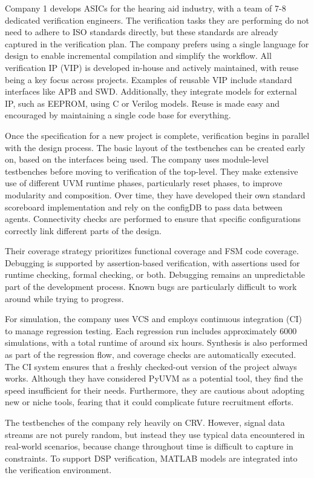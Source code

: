 \documentclass[12pt]{report}
\begin{document}
Company 1 develops ASICs for the hearing aid industry, with a team of 7-8 dedicated verification engineers. The
verification tasks they are performing do not need to adhere to ISO standards directly, but these standards are
already captured in the verification plan. The company prefers using a single language for design to enable
incremental compilation and simplify the workflow. All verification IP (VIP) is developed in-house and actively
maintained, with reuse being a key focus across projects. Examples of reusable VIP include standard interfaces like
APB and SWD. Additionally, they integrate models for external IP, such as EEPROM, using C or Verilog models. Reuse is
made easy and encouraged by maintaining a single code base for everything.

Once the specification for a new project is complete, verification begins in parallel with the design process. The
basic layout of the testbenches can be created early on, based on the interfaces being used. The company uses
module-level testbenches before moving to verification of the top-level. They make extensive use of different UVM
runtime phases, particularly reset phases, to improve modularity and composition. Over time, they have developed
their own standard scoreboard implementation and rely on the configDB to pass data between agents. Connectivity
checks are performed to ensure that specific configurations correctly link different parts of the design.

Their coverage strategy prioritizes functional coverage and FSM code coverage. Debugging is supported by
assertion-based verification, with assertions used for runtime checking, formal checking, or both. Debugging remains
an unpredictable part of the development process. Known bugs are particularly difficult to work around while trying to progress.

For simulation, the company uses VCS and employs continuous integration (CI) to manage regression testing. Each
regression run includes approximately 6000 simulations, with a total runtime of around six hours. Synthesis is also
performed as part of the regression flow, and coverage checks are automatically executed. The CI system ensures that
a freshly checked-out version of the project always works. Although they have considered PyUVM as a potential tool,
they find the speed insufficient for their needs. Furthermore, they are cautious about adopting new or niche tools,
fearing that it could complicate future recruitment efforts.

The testbenches of the company rely heavily on CRV. However, signal data streams are not purely random, but instead
they use typical data encountered in real-world scenarios, because change throughout time is difficult to capture in
constraints. To support DSP verification, MATLAB models are integrated into the verification environment.
\end{document}
